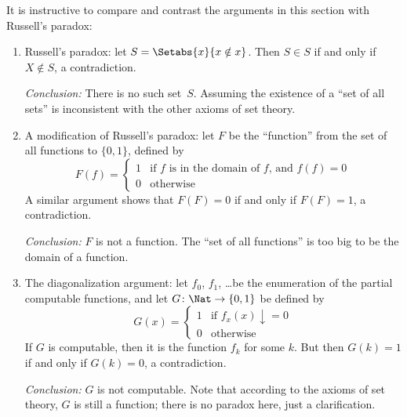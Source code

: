 \documentclass[../../../include/open-logic-section]{subfiles}
\begin{document}

It is instructive to compare and contrast the arguments in
this section with Russell's paradox:
\begin{enumerate}
\item Russell's paradox: let $S = \Setabs{x}{x \notin x}$. Then $S
  \in S$ if and only if $X \notin S$, a contradiction.

  \emph{Conclusion:} There is no such set~$S$. Assuming the existence of a
  ``set of all sets'' is inconsistent with the other axioms of set
  theory.

\item A modification of Russell's paradox: let $F$ be the ``function''
  from the set of all functions to $\{ 0, 1 \}$, defined by
  \[
  F(f) =
  \begin{cases}
    1 & \text{if $f$ is in the domain of $f$, and $f(f) = 0$} \\
    0 & \text{otherwise}
  \end{cases}
  \]
  A similar argument shows that $F(F) = 0$ if and only if $F(F) = 1$,
  a contradiction.

  \emph{Conclusion:} $F$ is not a function. The ``set of all
  functions'' is too big to be the domain of a function.

\item The diagonalization argument: let $f_0$, $f_1$, \dots be the
  enumeration of the partial computable functions, and let $G \colon \Nat \to
  \{ 0, 1 \}$ be defined by
  \[
  G(x) =
  \begin{cases}
    1 & \text{if $f_x(x)\downarrow = 0$} \\
    0 & \text{otherwise}
  \end{cases}
  \]
  If $G$ is computable, then it is the function $f_k$ for some
  $k$. But then $G(k) = 1$ if and only if $G(k) = 0$, a contradiction.

  \emph{Conclusion:} $G$ is not computable. Note that according to the
  axioms of set theory, $G$ is still a function; there is no paradox
  here, just a clarification.
\end{enumerate}
\end{document}
